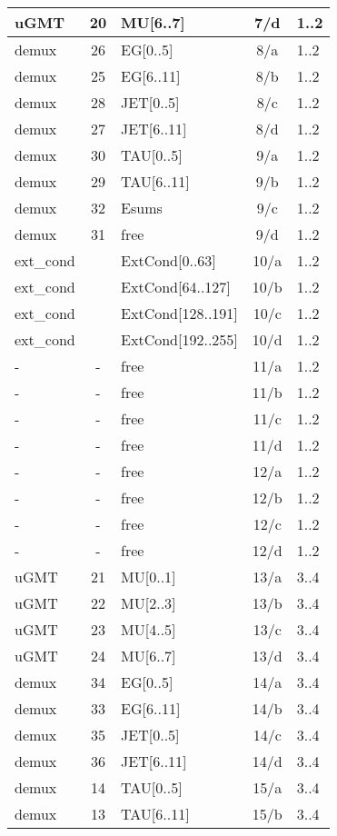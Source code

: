 \begin{longtable}{|l|c|l|c|l|}
uGMT  & 20  & MU[6..7]   & 7/d  & 1..2 \\\hline
demux & 26  & EG[0..5]   & 8/a  & 1..2 \\\hline
demux & 25  & EG[6..11]  & 8/b  & 1..2 \\\hline
demux & 28  & JET[0..5]  & 8/c  & 1..2 \\\hline
demux & 27  & JET[6..11] & 8/d  & 1..2 \\\hline
demux & 30  & TAU[0..5]  & 9/a  & 1..2 \\\hline
demux & 29  & TAU[6..11] & 9/b  & 1..2 \\\hline
demux & 32  & Esums      & 9/c  & 1..2 \\\hline
demux & 31  & free      & 9/d  & 1..2 \\\hline
ext\_cond &     & ExtCond[0..63]    & 10/a & 1..2 \\\hline
ext\_cond &     & ExtCond[64..127]  & 10/b & 1..2 \\\hline
ext\_cond &     & ExtCond[128..191] & 10/c & 1..2 \\\hline
ext\_cond &     & ExtCond[192..255] & 10/d & 1..2 \\\hline
- & - & free & 11/a & 1..2 \\\hline
- & - & free & 11/b & 1..2 \\\hline
- & - & free & 11/c & 1..2 \\\hline
- & - & free & 11/d & 1..2 \\\hline
- & - & free & 12/a & 1..2 \\\hline
- & - & free & 12/b & 1..2 \\\hline
- & - & free & 12/c & 1..2 \\\hline
- & - & free & 12/d & 1..2 \\\hline
\hline
uGMT  & 21  & MU[0..1]   & 13/a & 3..4 \\\hline
uGMT  & 22  & MU[2..3]   & 13/b & 3..4 \\\hline
uGMT  & 23  & MU[4..5]   & 13/c & 3..4 \\\hline
uGMT  & 24  & MU[6..7]   & 13/d & 3..4 \\\hline
demux & 34  & EG[0..5]   & 14/a & 3..4 \\\hline
demux & 33  & EG[6..11]  & 14/b & 3..4 \\\hline
demux & 35  & JET[0..5]  & 14/c & 3..4 \\\hline
demux & 36  & JET[6..11] & 14/d & 3..4 \\\hline
demux & 14  & TAU[0..5]  & 15/a & 3..4 \\\hline
demux & 13  & TAU[6..11] & 15/b & 3..4 \\\hline

\end{longtable}
